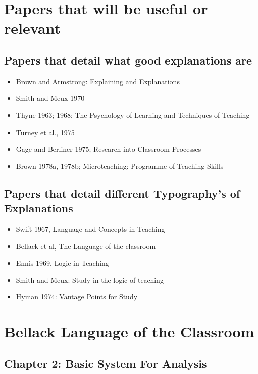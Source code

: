 \documentclass[10pt, letterpaper]{article}
\begin{document}
\section*{Papers that will be useful or relevant}
\label{sec:org38d88ac}

\subsection*{Papers that detail what good explanations are}
\label{sec:org33cfddb}
\begin{itemize}
\item Brown and Armstrong: Explaining and Explanations \cite{brown1984explaining}
\item Smith and Meux 1970
\item Thyne 1963; 1968; The Psychology of Learning and Techniques of Teaching \cite{thyne1965psychology}
\item Turney et al., 1975
\item Gage and Berliner 1975; Research into Classroom Processes
\item Brown 1978a, 1978b; Microteaching: Programme of Teaching Skills \cite{10.2307/3120386}
\end{itemize}

\subsection*{Papers that detail different Typography's of Explanations}
\label{sec:org42d7aa1}
\begin{itemize}
\item Swift 1967, Language and Concepts in Teaching \cite{smith1967language}
\item Bellack et al, The Language of the classroom \cite{bellack1966language}
\item Ennis 1969, Logic in Teaching \cite{ennis1969logic}
\item Smith and Meux: Study in the logic of teaching \cite{Smith1970-SMIASO-13}
\item Hyman 1974: Vantage Points for Study \cite{hyman1968teaching}
\end{itemize}


\section*{Bellack Language of the Classroom}
\label{sec:org1d69eb8}

\subsection*{Chapter 2: Basic System For Analysis}
\label{sec:org24482e1}
\end{document}
